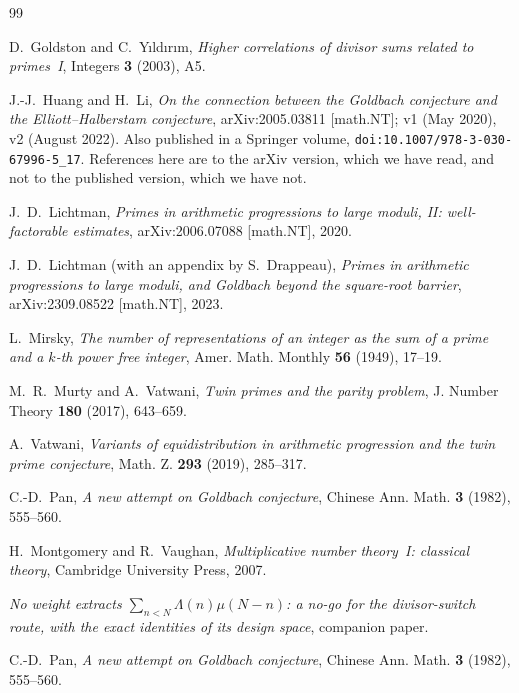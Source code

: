 \documentclass[11pt,a4paper]{article}
\theoremstyle{plain}
\theoremstyle{definition}
\theoremstyle{remark}
\begin{document}
\begin{thebibliography}{99}

 D.~Goldston and C.~Y{\i}ld{\i}r{\i}m,
\emph{Higher correlations of divisor sums related to primes~I},
Integers \textbf{3} (2003), A5.

 J.-J.~Huang and H.~Li, \emph{On the connection between
the Goldbach conjecture and the Elliott--Halberstam conjecture},
arXiv:2005.03811 [math.NT]; v1 (May 2020), v2 (August 2022). Also
published in a Springer volume,
\texttt{doi:10.1007/978-3-030-67996-5\_17}. References here are to the
arXiv version, which we have read, and not to the published version,
which we have not.

 J.~D.~Lichtman, \emph{Primes in arithmetic
progressions to large moduli, II: well-factorable estimates},
arXiv:2006.07088 [math.NT], 2020.

 J.~D.~Lichtman (with an appendix by S.~Drappeau),
\emph{Primes in arithmetic progressions to large moduli, and Goldbach
beyond the square-root barrier}, arXiv:2309.08522 [math.NT], 2023.

 L.~Mirsky, \emph{The number of representations of an
integer as the sum of a prime and a $k$-th power free integer},
Amer. Math. Monthly \textbf{56} (1949), 17--19.

 M.~R.~Murty and A.~Vatwani, \emph{Twin primes and
the parity problem}, J. Number Theory \textbf{180} (2017), 643--659.

 A.~Vatwani, \emph{Variants of equidistribution in
arithmetic progression and the twin prime conjecture}, Math. Z.
\textbf{293} (2019), 285--317.

 C.-D.~Pan, \emph{A new attempt on Goldbach conjecture},
Chinese Ann. Math. \textbf{3} (1982), 555--560.

 H.~Montgomery and R.~Vaughan, \emph{Multiplicative number
theory~I: classical theory}, Cambridge University Press, 2007.

 \emph{No weight extracts $\sum_{n<N}\Lambda(n)\mu(N-n)$:
a no-go for the divisor-switch route, with the exact identities of its
design space}, companion paper.

 C.-D.~Pan, \emph{A new attempt on Goldbach conjecture},
Chinese Ann. Math. \textbf{3} (1982), 555--560.

\end{thebibliography}
\end{document}

